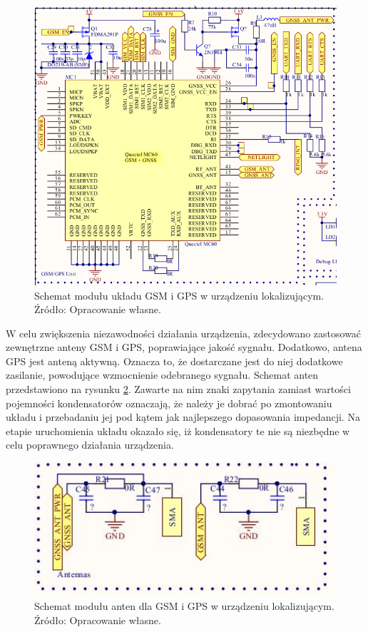 \begin{figure}[H]
	\centering
	\includegraphics[width=15cm]{img/schematics/mainboard_gps_fixed.png}
	\caption{Schemat modułu układu GSM i GPS w urządzeniu lokalizującym. \\ Źródło: Opracowanie własne.}
	\label{fig:image_mainboard_functional_gps_gsm}
\end{figure}

W celu zwiększenia niezawodności działania urządzenia, zdecydowano zastosować zewnętrzne anteny GSM i GPS, poprawiające jakość sygnału. Dodatkowo, antena GPS jest anteną aktywną. Oznacza to, że dostarczane jest do niej dodatkowe zasilanie, powodujące wzmocnienie odebranego sygnału. Schemat anten przedstawiono na rysunku \ref{fig:image_mainboard_functional_gps_gsm_antennas}. Zawarte na nim znaki zapytania zamiast wartości pojemności kondensatorów oznaczają, że należy je dobrać po zmontowaniu układu i przebadaniu jej pod kątem jak najlepszego dopasowania impedancji. Na etapie uruchomienia układu okazało się, iż kondensatory te nie są niezbędne w celu poprawnego działania urządzenia.

\begin{figure}[H]
	\centering
	\includegraphics[width=15cm]{img/schematics/mainboard_functional_gps_gsm_antennas.jpg}
	\caption{Schemat modułu anten dla GSM i GPS w urządzeniu lokalizującym. \\ Źródło: Opracowanie własne.}
	\label{fig:image_mainboard_functional_gps_gsm_antennas}
\end{figure}

